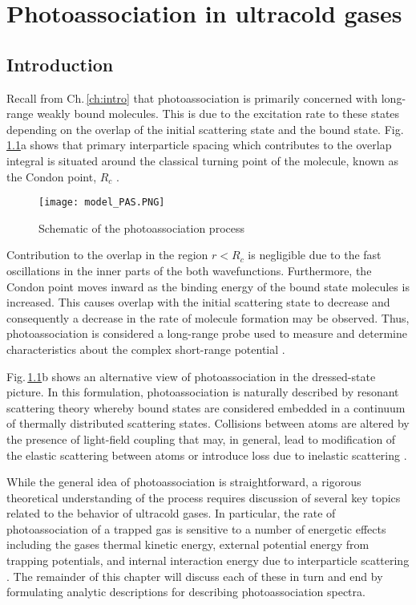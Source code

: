 \chapter{Photoassociation in ultracold gases} \label{ch:chap3}
\section{Introduction} \label{sec:pas_intro}
Recall from Ch.\,\ref{ch:intro} that photoassociation is primarily concerned with long-range weakly bound molecules.
This is due to the excitation rate to these states depending on the overlap of the initial scattering state and the bound state.
Fig.\,\ref{fig:3pasSch}a shows that primary interparticle spacing which contributes to the overlap integral is situated around the classical turning point of the molecule, known as the Condon point, $R_c$ \cite{Bohn1999,bav00}.
\begin{figure}
	\centerline{
	\texttt{[image: model\_PAS.PNG]}}
	\caption{Schematic of the photoassociation process}{}
	\label{fig:3pasSch}
\end{figure}
Contribution to the overlap in the region $r < R_c$ is negligible due to the fast oscillations in the inner parts of the both wavefunctions.
Furthermore, the Condon point moves inward as the binding energy of the bound state molecules is increased. 
This causes overlap with the initial scattering state to decrease and consequently a decrease in the rate of molecule formation may be observed.
Thus, photoassociation is considered a long-range probe used to measure and determine characteristics about the complex short-range potential \cite{Krems2009a,Julienne2009a,nse06,Jones2006}.

Fig.\,\ref{fig:3pasSch}b shows an alternative view of photoassociation in the dressed-state picture.
In this formulation, photoassociation is naturally described by resonant scattering theory whereby bound states are considered embedded in a continuum of thermally distributed scattering states.
Collisions between atoms are altered by the presence of light-field coupling that may, in general, lead to modification of the elastic scattering between atoms or introduce loss due to inelastic scattering  \cite{Jones2006, Thorsheim1987, Fano1961, Nicholson2015a}.

While the general idea of photoassociation is straightforward, a rigorous theoretical understanding of the process requires discussion of several key topics related to the behavior of ultracold gases.
In particular, the rate of photoassociation of a trapped gas is sensitive to a number of energetic effects including the gases thermal kinetic energy, external potential energy from trapping potentials, and internal interaction energy due to interparticle scattering \cite{Julienne2009a}.
The remainder of this chapter will discuss each of these in turn and end by formulating analytic descriptions for describing photoassociation spectra.	

